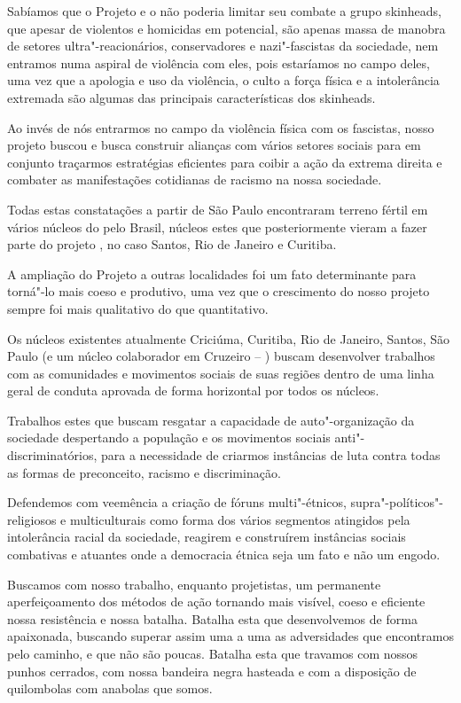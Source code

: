 Sabíamos que o Projeto  e o  não poderia limitar seu combate a grupo skinheads, que apesar de violentos e homicidas em potencial, são apenas massa de manobra de setores ultra"-reacionários, conservadores e nazi"-fascistas da sociedade, nem entramos numa aspiral de violência com eles, pois estaríamos no campo deles, uma vez que a apologia e uso da violência, o culto a força física e a intolerância extremada são algumas das principais características dos skinheads.

Ao invés de nós entrarmos no campo da violência física com os fascistas, nosso projeto buscou e busca construir alianças com vários setores sociais para em conjunto traçarmos estratégias eficientes para coibir a ação da extrema direita e combater as manifestações cotidianas de racismo na nossa sociedade.

Todas estas constatações a partir de São Paulo encontraram terreno fértil em vários núcleos do  pelo Brasil, núcleos estes que posteriormente vieram a fazer parte do projeto , no caso Santos, Rio de Janeiro e Curitiba.

A ampliação do Projeto  a outras localidades foi um fato determinante para torná"-lo mais coeso e produtivo, uma vez que o crescimento do nosso projeto sempre foi mais qualitativo do que quantitativo.

Os núcleos existentes atualmente Criciúma, Curitiba, Rio de Janeiro, Santos, São Paulo (e um núcleo colaborador em Cruzeiro -- ) buscam desenvolver trabalhos com as comunidades e movimentos sociais de suas regiões dentro de uma linha geral de conduta aprovada de forma horizontal por todos os núcleos.

Trabalhos estes que buscam resgatar a capacidade de auto"-organização da sociedade despertando a população e os movimentos sociais anti"-discriminatórios, para a necessidade de criarmos instâncias de luta contra todas as formas de preconceito, racismo e discriminação.

Defendemos com veemência a criação de fóruns multi"-étnicos, supra"-políticos"-religiosos e multiculturais como forma dos vários segmentos atingidos pela intolerância racial da sociedade, reagirem e construírem instâncias sociais combativas e atuantes onde a democracia étnica seja um fato e não um engodo.

Buscamos com nosso trabalho, enquanto projetistas, um permanente aperfeiçoamento dos métodos de ação tornando mais visível, coeso e eficiente nossa resistência e nossa batalha.
Batalha esta que desenvolvemos de forma apaixonada, buscando superar assim uma a uma as adversidades que encontramos pelo caminho, e que não são poucas.
Batalha esta que travamos com nossos punhos cerrados, com nossa bandeira negra hasteada e com a disposição de quilombolas com anabolas que somos.

